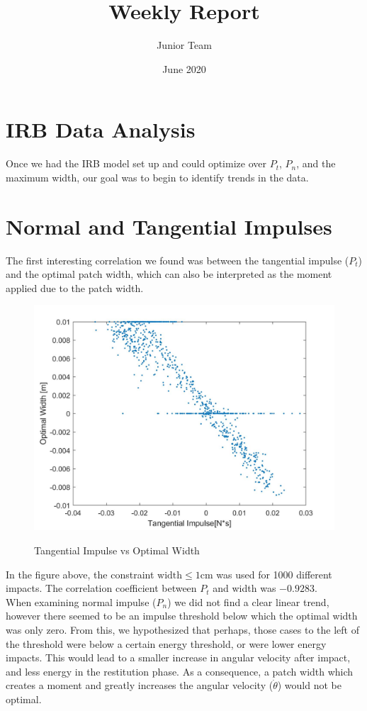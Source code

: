 \documentclass{article}
\title{Weekly Report}
\author{Junior Team }
\date{June 2020}
\begin{document}
\maketitle

\section*{IRB Data Analysis}
Once we had the IRB model set up and could optimize over $P_t$, $P_n$, and the maximum width, our goal was to begin to identify trends in the data.

\section{Normal and Tangential Impulses}
The first interesting correlation we found was between the tangential impulse ($P_t$) and the optimal patch width, which can also be interpreted as the moment applied due to the patch width.


\begin{figure}[h!]
\centering
\caption{Tangential Impulse vs Optimal Width}
\includegraphics[scale=0.2]{tanImpulse}
\label{fig:tanImpulse}
\end{figure}

\noindent In the figure above, the constraint $\mbox{width} \leq 1 \mbox{cm}$ was used for 1000 different impacts. The correlation coefficient between $P_t$ and width was $ -0.9283$. \\

\noindent  When examining normal impulse ($P_n$) we did not find a clear linear trend, however there seemed to be an impulse threshold below which the optimal width was only zero. From this, we hypothesized that perhaps, those cases to the left of the threshold were below a certain energy threshold, or were lower energy impacts. This would lead to a smaller increase in angular velocity after impact, and less energy in the restitution phase. As a consequence, a patch width which creates a moment and greatly increases the angular velocity ($\dot\theta$) would not be optimal.\\
\end{document}

